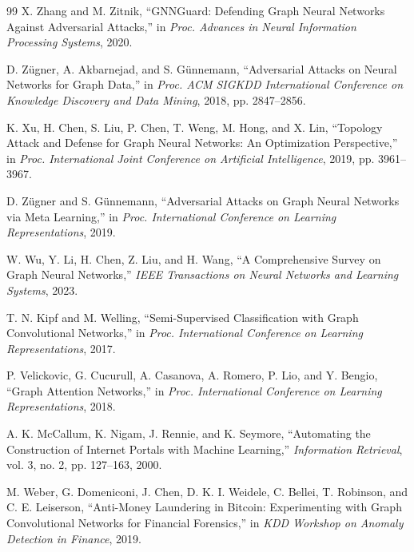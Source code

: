 \documentclass[12pt,oneside]{report}
\begin{document}
\clearpage
\renewcommand{\bibname}{References}
\begin{singlespace}
\begin{thebibliography}{99}
X. Zhang and M. Zitnik, ``GNNGuard: Defending Graph Neural Networks Against Adversarial Attacks,'' in \textit{Proc. Advances in Neural Information Processing Systems}, 2020.

D. Z\"ugner, A. Akbarnejad, and S. G\"unnemann, ``Adversarial Attacks on Neural Networks for Graph Data,'' in \textit{Proc. ACM SIGKDD International Conference on Knowledge Discovery and Data Mining}, 2018, pp. 2847--2856.

K. Xu, H. Chen, S. Liu, P. Chen, T. Weng, M. Hong, and X. Lin, ``Topology Attack and Defense for Graph Neural Networks: An Optimization Perspective,'' in \textit{Proc. International Joint Conference on Artificial Intelligence}, 2019, pp. 3961--3967.

D. Z\"ugner and S. G\"unnemann, ``Adversarial Attacks on Graph Neural Networks via Meta Learning,'' in \textit{Proc. International Conference on Learning Representations}, 2019.

W. Wu, Y. Li, H. Chen, Z. Liu, and H. Wang, ``A Comprehensive Survey on Graph Neural Networks,'' \textit{IEEE Transactions on Neural Networks and Learning Systems}, 2023.

T. N. Kipf and M. Welling, ``Semi-Supervised Classification with Graph Convolutional Networks,'' in \textit{Proc. International Conference on Learning Representations}, 2017.

P. Velickovic, G. Cucurull, A. Casanova, A. Romero, P. Lio, and Y. Bengio, ``Graph Attention Networks,'' in \textit{Proc. International Conference on Learning Representations}, 2018.

A. K. McCallum, K. Nigam, J. Rennie, and K. Seymore, ``Automating the Construction of Internet Portals with Machine Learning,'' \textit{Information Retrieval}, vol. 3, no. 2, pp. 127--163, 2000.

M. Weber, G. Domeniconi, J. Chen, D. K. I. Weidele, C. Bellei, T. Robinson, and C. E. Leiserson, ``Anti-Money Laundering in Bitcoin: Experimenting with Graph Convolutional Networks for Financial Forensics,'' in \textit{KDD Workshop on Anomaly Detection in Finance}, 2019.


\end{thebibliography}
\end{singlespace}
\end{document}
